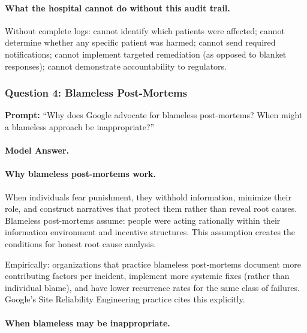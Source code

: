 \paragraph{What the hospital cannot do without this audit trail.}

Without complete logs: cannot identify which patients were affected; cannot determine whether any specific patient was harmed; cannot send required notifications; cannot implement targeted remediation (as opposed to blanket responses); cannot demonstrate accountability to regulators.

\subsubsection{Question 4: Blameless Post-Mortems}

\textbf{Prompt:} ``Why does Google advocate for blameless post-mortems? When might a blameless approach be inappropriate?''

\paragraph{Model Answer.}

\paragraph{Why blameless post-mortems work.}

When individuals fear punishment, they withhold information, minimize their role, and construct narratives that protect them rather than reveal root causes. Blameless post-mortems assume: people were acting rationally within their information environment and incentive structures. This assumption creates the conditions for honest root cause analysis.

Empirically: organizations that practice blameless post-mortems document more contributing factors per incident, implement more systemic fixes (rather than individual blame), and have lower recurrence rates for the same class of failures. Google's Site Reliability Engineering practice cites this explicitly.

\paragraph{When blameless may be inappropriate.}

